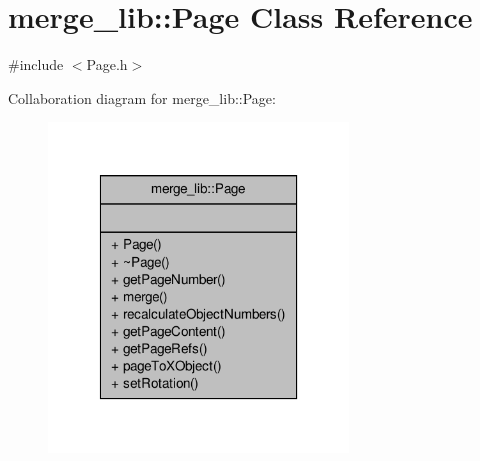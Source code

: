 \hypertarget{classmerge__lib_1_1_page}{\section{merge\-\_\-lib\-:\-:Page Class Reference}
\label{db/d32/classmerge__lib_1_1_page}
}


{\ttfamily \#include $<$Page.\-h$>$}



Collaboration diagram for merge\-\_\-lib\-:\-:Page\-:
\nopagebreak
\begin{figure}[H]
\begin{center}
\leavevmode
\includegraphics[width=226pt]{d1/df8/classmerge__lib_1_1_page__coll__graph}
\end{center}
\end{figure}

